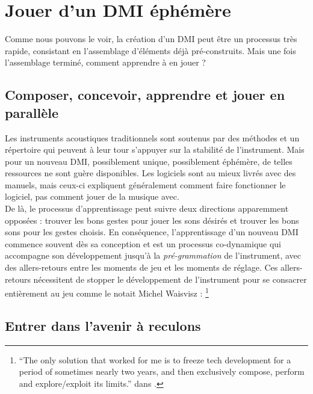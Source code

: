 \section{Jouer d'un DMI éphémère}
\label{sec:ephemeral:playing-a-DMI}

\noindent Comme nous pouvons le voir, la création d'un \gls{DMI} peut être un processus très rapide, consistant en l'assemblage d'éléments déjà pré-construits. Mais une fois l'assemblage terminé, comment apprendre à en jouer ?

\subsection{Composer, concevoir, apprendre et jouer en parallèle}

\noindent Les instruments acoustiques traditionnels sont soutenus par des méthodes et un répertoire qui peuvent à leur tour s'appuyer sur la stabilité de l'instrument. Mais pour un nouveau \gls{DMI}, possiblement unique, possiblement éphémère, de telles ressources ne sont guère disponibles. Les logiciels sont au mieux livrés avec des manuels, mais ceux-ci expliquent généralement comment faire fonctionner le logiciel, pas comment jouer de la musique avec.\\
\indent De là, le processus d'apprentissage peut suivre deux directions apparemment opposées : trouver les bons gestes pour jouer les sons désirés et trouver les bons sons pour les gestes choisis. En conséquence, l'apprentissage d'un nouveau \gls{DMI} commence souvent dès sa conception et est un processus co-dynamique qui accompagne son développement jusqu'à la \textit{pré-grammation} de l'instrument, avec des allers-retours entre les moments de jeu et les moments de réglage. Ces allers-retours nécessitent de stopper le développement de l'instrument pour se consacrer entièrement au jeu comme le notait Michel Waisvisz : \footnote{``The only solution that worked for me is to freeze tech development for a period of sometimes nearly two years, and then exclusively compose, perform and explore/exploit its limits.'' dans \cite{wanderley_trends_2000}.}

\subsection{Entrer dans l'avenir à reculons}

